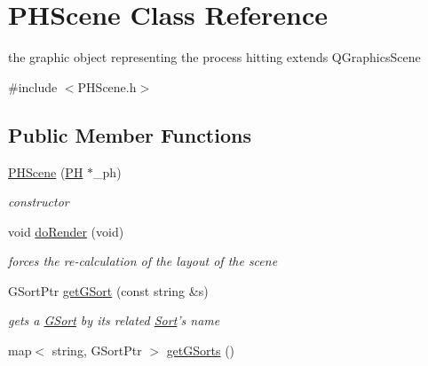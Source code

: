 \hypertarget{class_p_h_scene}{\section{\-P\-H\-Scene \-Class \-Reference}
\label{class_p_h_scene}
}


the graphic object representing the process hitting extends \-Q\-Graphics\-Scene  




{\ttfamily \#include $<$\-P\-H\-Scene.\-h$>$}

\subsection*{\-Public \-Member \-Functions}
\begin{DoxyCompactItemize}
\item 
\hypertarget{class_p_h_scene_ab911261388ccc14254980b5d01909d61}{\hyperlink{class_p_h_scene_ab911261388ccc14254980b5d01909d61}{\-P\-H\-Scene} (\hyperlink{class_p_h}{\-P\-H} $\ast$\-\_\-ph)}\label{class_p_h_scene_ab911261388ccc14254980b5d01909d61}

\begin{DoxyCompactList}\small\item\em constructor \end{DoxyCompactList}\item 
\hypertarget{class_p_h_scene_a2f9dbd3f096e6cfcd9e924617bcc7d98}{void \hyperlink{class_p_h_scene_a2f9dbd3f096e6cfcd9e924617bcc7d98}{do\-Render} (void)}\label{class_p_h_scene_a2f9dbd3f096e6cfcd9e924617bcc7d98}

\begin{DoxyCompactList}\small\item\em forces the re-\/calculation of the layout of the scene \end{DoxyCompactList}\item 
\-G\-Sort\-Ptr \hyperlink{class_p_h_scene_ae8be020b063c06f135d644937d65147b}{get\-G\-Sort} (const string \&s)
\begin{DoxyCompactList}\small\item\em gets a \hyperlink{class_g_sort}{\-G\-Sort} by its related \hyperlink{class_sort}{\-Sort}'s name \end{DoxyCompactList}\item 
\hypertarget{class_p_h_scene_aee9bc7ca9a154680f38f06005ad9f6ef}{map$<$ string, \-G\-Sort\-Ptr $>$ \hyperlink{class_p_h_scene_aee9bc7ca9a154680f38f06005ad9f6ef}{get\-G\-Sorts} ()}\label{class_p_h_scene_aee9bc7ca9a154680f38f06005ad9f6ef}


\end{DoxyCompactItemize}
